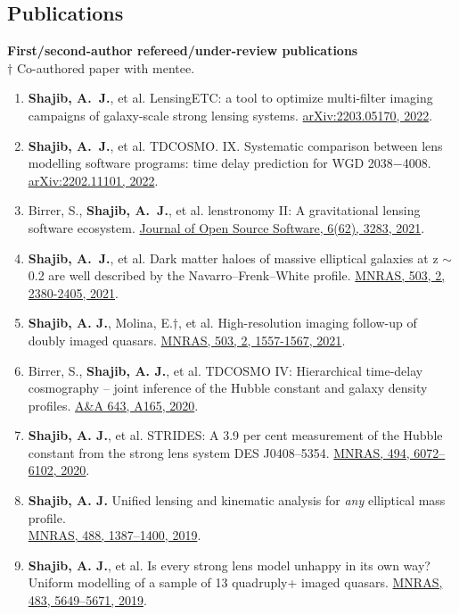 \documentclass[margin, line]{res}
\begin{document}
\begin{resume}

\section{\sc Publications}
\textbf{First/second-author refereed/under-review publications}
\\ $\dagger$ Co-authored paper with mentee.
\begin{enumerate}
	\item \textbf{Shajib, A.~J.}, et al. LensingETC: a tool to optimize multi-filter imaging campaigns of galaxy-scale strong lensing systems. \href{https://arxiv.org/abs/2203.05170}{arXiv:2203.05170, 2022}.
	\item \textbf{Shajib, A.~J.}, et al. TDCOSMO. IX. Systematic comparison between lens modelling software programs: time delay prediction for WGD 2038−4008. \href{https://arxiv.org/abs/2202.11101}{arXiv:2202.11101, 2022}.
	\item Birrer, S., \textbf{Shajib, A.~J.}, et al. lenstronomy II: A gravitational lensing software ecosystem. \href{https://joss.theoj.org/papers/10.21105/joss.03283}{Journal of Open Source Software, 6(62), 3283, 2021}.
	\item \textbf{Shajib, A.~J.}, et al. Dark matter haloes of massive elliptical galaxies at z $\sim$ 0.2 are well described by the Navarro--Frenk--White profile. \href{https://doi.org/10.1093/mnras/stab536}{MNRAS, 503, 2, 2380-2405, 2021}.
	\item \textbf{Shajib, A. J.}, Molina, E.{$\dagger$}, et al. High-resolution imaging follow-up of doubly imaged quasars. \href{https://doi:10.1093/mnras/stab532}{MNRAS, 503, 2, 1557-1567, 2021}.
	\item Birrer, S., \textbf{Shajib, A. J.}, et al. TDCOSMO IV: Hierarchical time-delay cosmography -- joint inference of the Hubble constant and galaxy density profiles. \href{https://doi.org/10.1051/0004-6361/202038861}{A\&A 643, A165, 2020}.
	\item \textbf{Shajib, A. J.}, et al. STRIDES: A 3.9 per cent measurement of the Hubble constant from the strong lens system DES J0408--5354. \href{https://academic.oup.com/mnras/advance-article-abstract/doi/10.1093/mnras/staa828/5813265}{MNRAS, 494, 6072--6102, 2020}.
	\item \textbf{Shajib, A. J.} Unified lensing and kinematic analysis for \textit{any} elliptical mass profile. \\ \href{https://doi.org/10.1093/mnras/stz1796}{MNRAS, 488, 1387--1400, 2019}.
	\item \textbf{Shajib, A. J.}, et al. Is every strong lens model unhappy in its own way? Uniform modelling of a sample of 13 quadruply+ imaged quasars. \href{https://doi.org/10.1093/mnras/sty3397}{MNRAS, 483, 5649--5671, 2019}.

\end{enumerate}
\end{resume}
\end{document}
